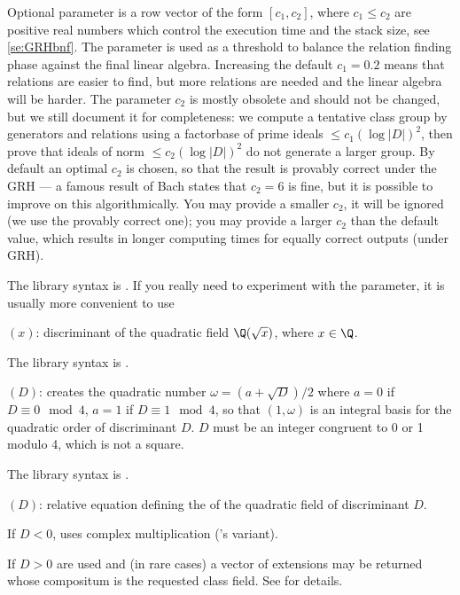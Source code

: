Optional parameter  is a row vector of the form $[c_1, c_2]$,
where $c_1 \leq c_2$ are positive real numbers which control the execution
time and the stack size, see \ref{se:GRHbnf}. The parameter is used as a
threshold to balance the relation finding phase against the final linear
algebra. Increasing the default $c_1 = 0.2$ means that relations are easier
to find, but more relations are needed and the linear algebra will be
harder. The parameter $c_2$ is mostly obsolete and should not be changed,
but we still document it for completeness: we compute a tentative class
group by generators and relations using a factorbase of prime ideals $\leq
c_1 (\log |D|)^2$, then prove that ideals of norm $\leq c_2 (\log |D|)^2$ do
not generate a larger group. By default an optimal $c_2$ is chosen, so that
the result is provably correct under the GRH --- a famous result of Bach
states that $c_2 = 6$ is fine, but it is possible to improve on this
algorithmically. You may provide a smaller $c_2$, it will be ignored
(we use the provably correct
one); you may provide a larger $c_2$ than the default value, which results
in longer computing times for equally correct outputs (under GRH).

The library syntax is .
If you really need to experiment with the  parameter, it is
usually more convenient to use

$(x)$: \label{se:quaddisc}discriminant of the quadratic field $\Q(\sqrt{x})$, where $x\in\Q$.

The library syntax is .

$(D)$: \label{se:quadgen}creates the quadratic
number $\omega=(a+\sqrt{D})/2$ where $a=0$ if $D\equiv0\mod4$,
$a=1$ if $D\equiv1\mod4$, so that $(1,\omega)$ is an integral basis for the
quadratic order of discriminant $D$. $D$ must be an integer congruent to 0 or
1 modulo 4, which is not a square.

The library syntax is .

$(D)$: \label{se:quadhilbert}relative equation defining the
 of the quadratic field of discriminant $D$.

If $D < 0$, uses complex multiplication ('s variant).

If $D > 0$  are used and (in rare cases) a
vector of extensions may be returned whose compositum is the requested class
field. See  for details.

